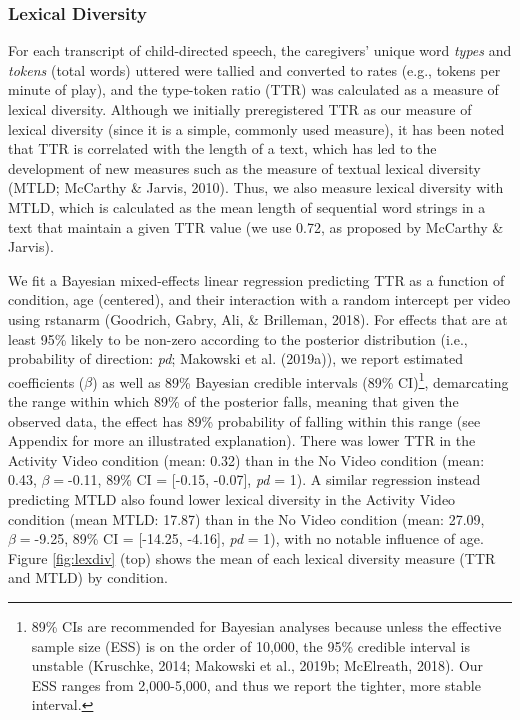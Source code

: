 \documentclass[
  english,
  man]{apa6}
\begin{document}
\hypertarget{lexical-diversity}{%
\subsubsection{Lexical Diversity}\label{lexical-diversity}}

For each transcript of child-directed speech, the caregivers' unique word \emph{types} and \emph{tokens} (total words) uttered were tallied and converted to rates (e.g., tokens per minute of play), and the type-token ratio (TTR) was calculated as a measure of lexical diversity.
Although we initially preregistered TTR as our measure of lexical diversity (since it is a simple, commonly used measure), it has been noted that TTR is correlated with the length of a text, which has led to the development of new measures such as the measure of textual lexical diversity (MTLD; McCarthy \& Jarvis, 2010).
Thus, we also measure lexical diversity with MTLD, which is calculated as the mean length of sequential word strings in a text that maintain a given TTR value (we use 0.72, as proposed by McCarthy \& Jarvis).

We fit a Bayesian mixed-effects linear regression predicting TTR as a function of condition, age (centered), and their interaction with a random intercept per video using rstanarm (Goodrich, Gabry, Ali, \& Brilleman, 2018).
For effects that are at least 95\% likely to be non-zero according to the posterior distribution (i.e., probability of direction: \emph{pd}; Makowski et al. (2019a)), we report estimated coefficients (\(\beta\)) as well as 89\% Bayesian credible intervals (89\% CI)\footnote{89\% CIs are recommended for Bayesian analyses because unless the effective sample size (ESS) is on the order of 10,000, the 95\% credible interval is unstable (Kruschke, 2014; Makowski et al., 2019b; McElreath, 2018). Our ESS ranges from 2,000-5,000, and thus we report the tighter, more stable interval.}, demarcating the range within which 89\% of the posterior falls, meaning that given the observed data, the effect has 89\% probability of falling within this range (see Appendix for more an illustrated explanation).
There was lower TTR in the Activity Video condition (mean: 0.32) than in the No Video condition (mean: 0.43, \(\beta=\)-0.11, 89\% CI = {[}-0.15, -0.07{]}, \emph{pd} = 1).
A similar regression instead predicting MTLD also found lower lexical diversity in the Activity Video condition (mean MTLD: 17.87) than in the No Video condition (mean: 27.09, \(\beta=\)-9.25, 89\% CI = {[}-14.25, -4.16{]}, \emph{pd} = 1), with no notable influence of age.
Figure \ref{fig:lexdiv} (top) shows the mean of each lexical diversity measure (TTR and MTLD) by condition.
\end{document}
